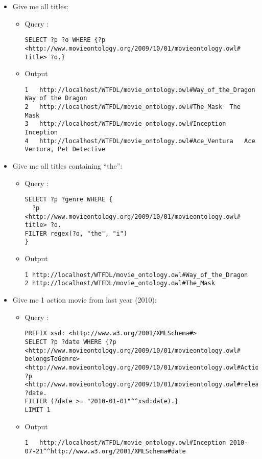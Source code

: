 \begin{itemize}

 \item Give me all titles:
  \begin{itemize}
    \item Query : 
\begin{verbatim}
SELECT ?p ?o WHERE {?p <http://www.movieontology.org/2009/10/01/movieontology.owl#
title> ?o.}
\end{verbatim}
    \item Output
      \begin{lstlisting}
1	http://localhost/WTFDL/movie_ontology.owl#Way_of_the_Dragon	Way of the Dragon	
2	http://localhost/WTFDL/movie_ontology.owl#The_Mask	The Mask	
3	http://localhost/WTFDL/movie_ontology.owl#Inception	Inception	
4	http://localhost/WTFDL/movie_ontology.owl#Ace_Ventura	Ace Ventura, Pet Detective	
      \end{lstlisting}
    \end{itemize}

 \item Give me all titles containing ``the'':
  \begin{itemize}
    \item Query : 
\begin{verbatim}
SELECT ?p ?genre WHERE {
  ?p <http://www.movieontology.org/2009/10/01/movieontology.owl#
title> ?o.
FILTER regex(?o, "the", "i")
}
\end{verbatim}
    \item Output
      \begin{lstlisting}
1 http://localhost/WTFDL/movie_ontology.owl#Way_of_the_Dragon 
2 http://localhost/WTFDL/movie_ontology.owl#The_Mask  
      \end{lstlisting}
    \end{itemize}

 \item Give me 1 action movie from last year (2010):
  \begin{itemize}
    \item Query : 
\begin{verbatim}
PREFIX xsd: <http://www.w3.org/2001/XMLSchema#>
SELECT ?p ?date WHERE {?p <http://www.movieontology.org/2009/10/01/movieontology.owl#
belongsToGenre> <http://www.movieontology.org/2009/10/01/movieontology.owl#Action>.
?p <http://www.movieontology.org/2009/10/01/movieontology.owl#releasedate> ?date.
FILTER (?date >= "2010-01-01"^^xsd:date).}
LIMIT 1
\end{verbatim}
    \item Output
      \begin{lstlisting}
1	http://localhost/WTFDL/movie_ontology.owl#Inception	2010-07-21^^http://www.w3.org/2001/XMLSchema#date
      \end{lstlisting}
    \end{itemize}


\end{itemize}
